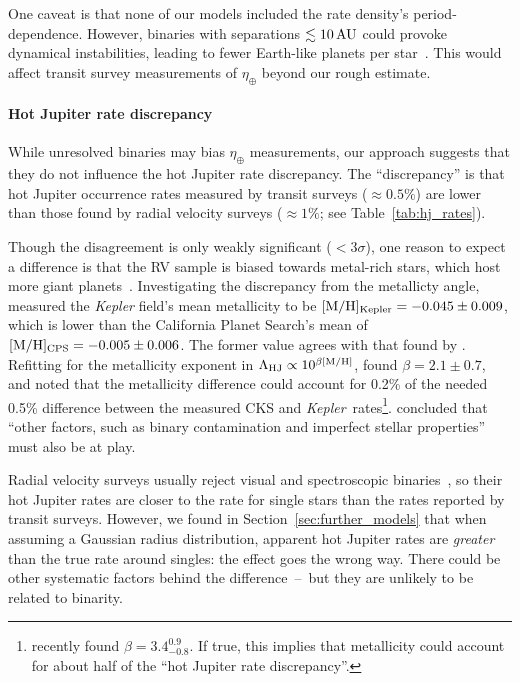 \documentclass[12pt,modern]{aastex61}
\begin{document}
One caveat is that none of our models included the rate density's
period-dependence. However, binaries with separations $\lesssim
10\,{\rm AU}$ could provoke dynamical instabilities, leading to fewer
Earth-like planets per
star~\citep[\textit{e.g.},][]{holman_long-term_1999,wang_influence_2014,
kraus_impact_2016}.  This would affect transit survey measurements of
$\eta_\oplus$ beyond our rough estimate.

\paragraph{Hot Jupiter rate discrepancy}
While unresolved binaries may bias $\eta_\oplus$ measurements, our
approach suggests that they do not influence the hot Jupiter rate
discrepancy.  The ``discrepancy'' is that hot Jupiter occurrence rates
measured by transit surveys ($\approx 0.5\%$) are lower than those
found by radial velocity surveys ($\approx 1\%$; see
Table~\ref{tab:hj_rates}).

Though the disagreement is only weakly significant ($<3\sigma$), one
reason to expect a difference is that the RV sample is biased towards
metal-rich stars, which host more giant
planets~\citep{santos_spectroscopic_2004,fischer_planet-metallicity_2005,gould_frequency_2006}.
Investigating the discrepancy from the metallicty
angle,~\citet{guo_metallicity_2017} measured the {\it Kepler} field's
mean metallicity to be $[{\rm M/H}]_{\rm Kepler}= -0.045\pm0.009$,
which is lower than the California Planet Search's mean of $[{\rm
M/H}]_{\rm CPS}= -0.005\pm0.006$.  The former value agrees with that
found by \citet{dong_metallicities_2014}.  Refitting for the
metallicity exponent in $\Lambda_{\rm HJ} \propto 10^{\beta [{\rm
M/H}] }$, \citeauthor{guo_metallicity_2017}\! found $\beta = 2.1\pm
0.7$, and noted that the metallicity difference could account for
0.2\% of the needed 0.5\% difference between the measured CKS
and {\it Kepler}\ rates\footnote{ \citet{petigura_CKS_2017} recently
found $\beta = 3.4^{0.9}_{-0.8}$.  If true, this implies that
metallicity could account for about half of the ``hot Jupiter rate
discrepancy''.  }.  \citeauthor{guo_metallicity_2017}\!  concluded
that ``other factors, such as binary contamination and imperfect
stellar properties'' must also be at play.

Radial velocity surveys usually reject visual and spectroscopic
binaries~\citep{wright_frequency_2012}, so their hot Jupiter rates are
closer to the rate for single stars than the rates reported by transit
surveys.  However, we found in Section~\ref{sec:further_models} that
when assuming a Gaussian radius distribution, apparent hot Jupiter
rates are {\it greater} than the true rate around singles: the effect
goes the wrong way.  There could be other systematic factors behind
the difference~--~but they are unlikely to be related to binarity.
\end{document}
